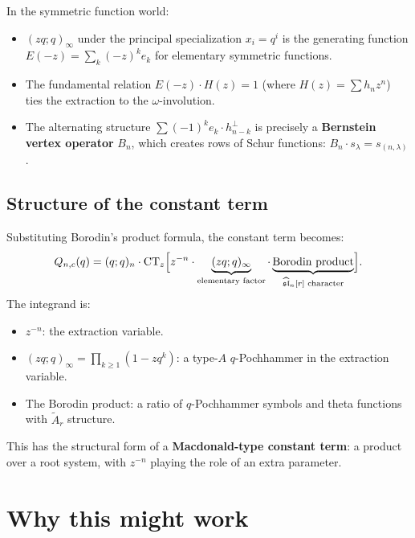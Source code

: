 \documentclass[11pt]{article}
\newcommand{\CT}{\operatorname{CT}}
\newcommand{\qpoch}[2]{(#1;#2)_\infty}
\newcommand{\sln}{\widehat{\mathfrak{sl}}_n}
\begin{document}
In the symmetric function world:
\begin{itemize}
  \item $\qpoch{zq}{q}$ under the principal specialization
    $x_i = q^i$ is the generating function
    $E(-z) = \sum_k (-z)^k e_k$ for elementary symmetric
    functions.
  \item The fundamental relation $E(-z) \cdot H(z) = 1$
    (where $H(z) = \sum h_n z^n$) ties the extraction to the
    $\omega$-involution.
  \item The alternating structure
    $\sum (-1)^k e_k \cdot h_{n-k}^{\perp}$ is precisely a
    \textbf{Bernstein vertex operator} $B_n$, which creates
    rows of Schur functions: $B_n \cdot s_\lambda = s_{(n,\lambda)}$.
\end{itemize}

\subsection{Structure of the constant term}

Substituting Borodin's product formula, the constant term
becomes:
\begin{equation}\label{eq:Q-CT-explicit}
  Q_{n,c}(q)
  = (q;q)_n \cdot
    \CT_z\Bigl[
      z^{-n} \cdot
      \underbrace{\qpoch{zq}{q}}_{\text{elementary factor}}
      \cdot
      \underbrace{\text{Borodin product}}_{\sln[r] \text{ character}}
    \Bigr].
\end{equation}
The integrand is:
\begin{itemize}
  \item $z^{-n}$: the extraction variable.
  \item $\qpoch{zq}{q} = \prod_{k \geq 1}(1 - zq^k)$:
    a type-$A$ $q$-Pochhammer in the extraction variable.
  \item The Borodin product: a ratio of $q$-Pochhammer symbols
    and theta functions with $\widetilde{A}_r$ structure.
\end{itemize}
This has the structural form of a \textbf{Macdonald-type
constant term}: a product over a root system, with
$z^{-n}$ playing the role of an extra parameter.

\section{Why this might work}
\label{sec:why}
\end{document}
